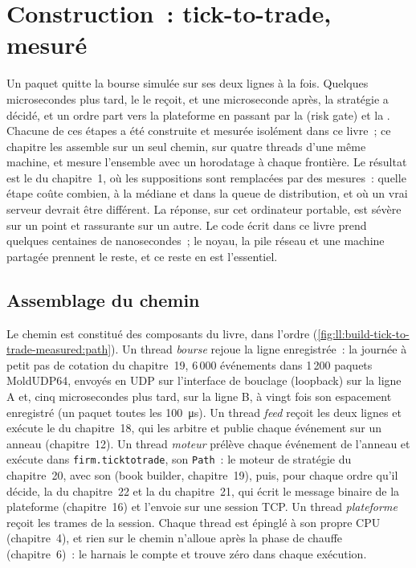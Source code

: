 \chapter{Construction~: tick-to-trade, mesuré}\label{ch:ll:build-tick-to-trade-measured}

Un paquet quitte la bourse simulée sur ses deux lignes à la fois. Quelques microsecondes plus tard, le  le reçoit, et une microseconde
après, la stratégie a décidé, et un ordre part vers la plateforme en passant par la  (risk gate) et la .
Chacune de ces étapes a été construite et mesurée isolément dans ce livre~; ce chapitre les assemble sur un seul chemin, sur quatre threads
d'une même machine, et mesure l'ensemble avec un horodatage à chaque frontière. Le résultat est le  du chapitre~1, où les
suppositions sont remplacées par des mesures~: quelle étape coûte combien, à la médiane et dans la queue de distribution, et où un vrai serveur devrait
être différent. La réponse, sur cet ordinateur portable, est sévère sur un point et rassurante sur un autre. Le code écrit dans ce livre
prend quelques centaines de nanosecondes~; le noyau, la pile réseau et une machine partagée prennent le reste, et ce reste en est l'essentiel.

\section{Assemblage du chemin}

Le chemin est constitué des composants du livre, dans l'ordre (\cref{fig:ll:build-tick-to-trade-measured:path}). Un thread \emph{bourse} rejoue
la ligne enregistrée~: la journée à petit pas de cotation du chapitre~19, 6\,000 événements dans 1\,200 paquets MoldUDP64, envoyés en UDP sur l'interface
de bouclage (loopback) sur la ligne A et, cinq microsecondes plus tard, sur la ligne B, à vingt fois son espacement enregistré (un paquet toutes les
\qty{100}{\micro\second}). Un thread \emph{feed} reçoit les deux lignes et exécute le  du chapitre~18, qui
les arbitre et publie chaque événement sur un anneau (chapitre~12). Un thread \emph{moteur} prélève chaque événement de l'anneau et exécute
dans \texttt{firm.ticktotrade}, son \texttt{Path}~: le moteur de stratégie du chapitre~20, avec son  (book builder, chapitre~19), puis, pour chaque
ordre qu'il décide, la  du chapitre~22 et la  du chapitre~21, qui écrit le message binaire de la plateforme
(chapitre~16) et l'envoie sur une session TCP. Un thread \emph{plateforme} reçoit les trames de la session. Chaque thread est épinglé à son
propre CPU (chapitre~4), et rien sur le chemin n'alloue après la phase de chauffe (chapitre~6)~: le harnais le compte et trouve zéro dans
chaque exécution.

